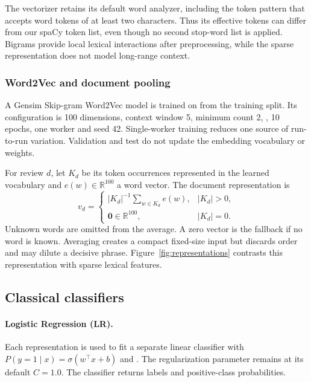 The vectorizer retains its default word analyzer, including the token pattern
that accepts word tokens of at least two characters. Thus its effective tokens
can differ from our spaCy token list, even though no second stop-word
list is applied. Bigrams provide local lexical interactions after preprocessing,
while the sparse representation does not model long-range context.

\subsubsection{Word2Vec and document pooling}
A Gensim Skip-gram Word2Vec model is trained on  from the
training split. Its configuration is 100 dimensions, context window 5, minimum
count 2, , 10 epochs, one worker and seed 42. Single-worker training
reduces one source of run-to-run variation. Validation and test do not update
the embedding vocabulary or weights.

For review $d$, let $K_d$ be its token occurrences represented in the learned
vocabulary and $e(w)\in\mathbb{R}^{100}$ a word vector. The document representation is
\begin{equation}
 v_d=\begin{cases}
 |K_d|^{-1}\sum_{w\in K_d} e(w), & |K_d|>0,\\
 \mathbf{0}\in\mathbb{R}^{100}, & |K_d|=0.
 \end{cases}
\end{equation}
Unknown words are omitted from the average. A zero vector is the fallback if
no word is known. Averaging creates a compact fixed-size input but discards
order and may dilute a decisive phrase. Figure~\ref{fig:representations}
contrasts this representation with sparse lexical features.

\subsection{Classical classifiers}
\paragraph{Logistic Regression (LR).}
Each representation is used to fit a separate linear classifier with
$P(y=1\mid x)=\sigma(w^\top x+b)$ and . The regularization
parameter remains at its default $C=1.0$. The classifier returns labels and
positive-class probabilities.

